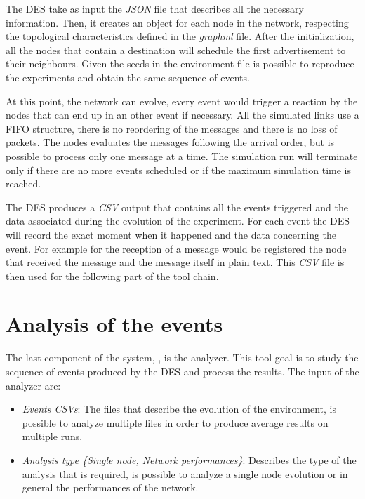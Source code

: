 The \ac{DES} take as input the \textit{JSON} file that describes all the necessary
information.
Then, it creates an object for each node in the network, respecting
the topological characteristics defined in the \textit{graphml} file.
After the initialization, all the nodes that contain a destination will schedule
the first advertisement to their neighbours.
Given the seeds in the environment file is possible to reproduce the experiments
and obtain the same sequence of events.

At this point, the network can evolve, every event would trigger a reaction by
the nodes that can end up in an other event if necessary.
All the simulated links use a \ac{FIFO} structure, there is no reordering of
the messages and there is no loss of packets.
The nodes evaluates the messages following the arrival order, but is possible
to process only one message at a time.
The simulation run will terminate only if there are no more events scheduled or
if the maximum simulation time is reached.

The \ac{DES} produces a \textit{CSV} output that contains all the events triggered and the
data associated during the evolution of the experiment.
For each event the \ac{DES} will record the exact moment when it happened and
the data concerning the event.
For example for the reception of a message would be registered
the node that received the message and the message itself in plain text.
This \textit{CSV} file is then used for the following part of the tool chain.

\section{Analysis of the events}
\label{sec:exp_output_study}

The last component of the system, , is the analyzer.
This tool goal is to study the sequence of events produced by the \ac{DES} and
process the results.
The input of the analyzer are:
\begin{itemize}
		\item \textit{Events CSVs}: The files that describe the evolution of
				the environment, is possible to analyze multiple files in order
				to produce average results on multiple runs.
		\item \textit{Analysis type \{Single node, Network performances\}}:
				Describes the type of the analysis that is required, is possible
				to analyze a single node evolution or in general the performances
				of the network.
\end{itemize}

